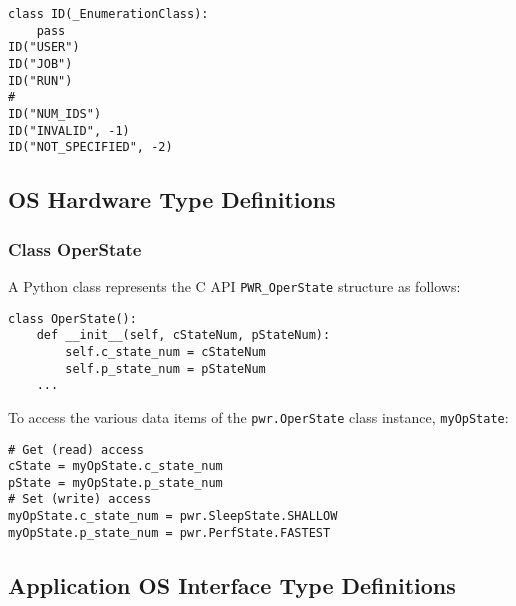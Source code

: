 \documentclass[12pt]{report} %
\begin{document}
\begin{appendices}
\begin{center}\begin{minipage}{.95\linewidth}\begin{lstlisting}
class ID(_EnumerationClass):
    pass
ID("USER")
ID("JOB")
ID("RUN")
#
ID("NUM_IDS")
ID("INVALID", -1)
ID("NOT_SPECIFIED", -2)
\end{lstlisting}\end{minipage}\end{center}

\subsection{OS Hardware Type Definitions}\label{sec:PythonOSHardwareTypeDefinitions}

\subsubsection{Class OperState} \label{class:OperState}

A Python class represents the C API \texttt{PWR_OperState} structure as follows:

\begin{center}\begin{minipage}{.95\linewidth}\begin{lstlisting}
class OperState():
    def __init__(self, cStateNum, pStateNum):
        self.c_state_num = cStateNum
        self.p_state_num = pStateNum
    ...
\end{lstlisting}\end{minipage}\end{center}

To access the various data items of the \texttt{pwr.OperState} class instance,
\texttt{myOpState}: 

\begin{center}\begin{minipage}{.95\linewidth}\begin{lstlisting}
# Get (read) access
cState = myOpState.c_state_num
pState = myOpState.p_state_num
# Set (write) access
myOpState.c_state_num = pwr.SleepState.SHALLOW
myOpState.p_state_num = pwr.PerfState.FASTEST

\end{lstlisting}\end{minipage}\end{center}

\subsection{Application OS Interface Type Definitions}
\label{sec:PythonApplicationOSInterfaceTypeDefinitions}


\end{appendices}
\end{document}
